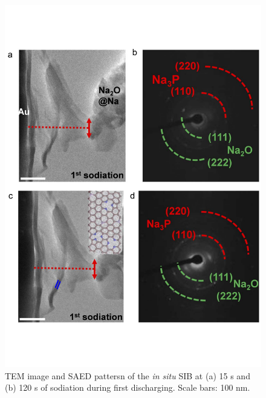 \begin{figure}  
\centering
\includegraphics[width=320pt,angle=0]{figures/figure4_3cd}
\caption[{\em in situ} sodiation process of P@GN SIB]
{
 TEM image and SAED pattersn of the {\em in situ} SIB at (a) 15 s and (b) 120 s of sodiation during first discharging. Scale bars: 100 nm.
\label{fig:4_3cd}}
\end{figure}

